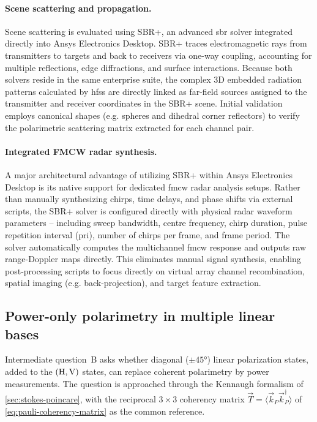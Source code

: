 \paragraph{Scene scattering and propagation.}
Scene scattering is evaluated using SBR+, an advanced \gls{sbr} solver integrated directly into Ansys Electronics Desktop.
SBR+ traces electromagnetic rays from transmitters to targets and back to receivers via one-way coupling, accounting for multiple reflections, edge diffractions, and surface interactions.
Because both solvers reside in the same enterprise suite, the complex 3D embedded radiation patterns calculated by \gls{hfss} are directly linked as far-field sources assigned to the transmitter and receiver coordinates in the SBR+ scene.
Initial validation employs canonical shapes (e.g. spheres and dihedral corner reflectors) to verify the polarimetric scattering matrix extracted for each channel pair.

\paragraph{Integrated FMCW radar synthesis.}
A major architectural advantage of utilizing SBR+ within Ansys Electronics Desktop is its native support for dedicated \gls{fmcw} radar analysis setups.
Rather than manually synthesizing chirps, time delays, and phase shifts via external scripts, the SBR+ solver is configured directly with physical radar waveform parameters -- including sweep bandwidth, centre frequency, chirp duration, pulse repetition interval (\gls{pri}), number of chirps per frame, and frame period.
The solver automatically computes the multichannel \gls{fmcw} response and outputs raw range-Doppler maps directly.
This eliminates manual signal synthesis, enabling post-processing scripts to focus directly on virtual array channel recombination, spatial imaging (e.g. back-projection), and target feature extraction.


\subsection{Power-only polarimetry in multiple linear bases}
\label{sec:multibasis-polarimetry}

Intermediate question~B asks whether diagonal ($\pm\ang{45}$) linear polarization states, added to the $(\mathrm{H}, \mathrm{V})$ states, can replace coherent polarimetry by power measurements.
The question is approached through the Kennaugh formalism of \cref{sec:stokes-poincare}, with the reciprocal $3 \times 3$ coherency matrix $\vec T = \langle \vec k_P \vec k_P^\dagger \rangle$ of \cref{eq:pauli-coherency-matrix} as the common reference.

